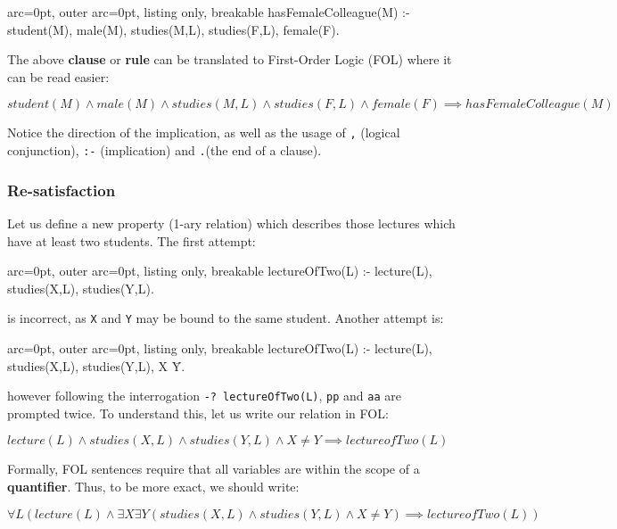 \begin{tcblisting}{ arc=0pt, outer arc=0pt, listing only, breakable}
hasFemaleColleague(M) :- student(M), male(M), studies(M,L), studies(F,L), female(F).

\end{tcblisting}


The above \textbf{clause} or \textbf{rule} can be translated to First-Order Logic (FOL) where it can be read easier:

$student(M) \wedge male(M) \wedge studies(M,L) \wedge studies(F,L) \wedge female(F) \implies hasFemaleColleague(M)$

Notice the direction of the implication, as well as the usage of \texttt{,} (logical conjunction), \texttt{:-} (implication) and \texttt{.}(the end of a clause).

\subsubsection*{ Re-satisfaction }

Let us define a new property (1-ary relation) which describes those lectures which have at least two students. The first attempt:


\begin{tcblisting}{ arc=0pt, outer arc=0pt, listing only, breakable}
lectureOfTwo(L) :- lecture(L), studies(X,L), studies(Y,L).

\end{tcblisting}


is incorrect, as \texttt{X} and \texttt{Y} may be bound to the same student. Another attempt is:


\begin{tcblisting}{ arc=0pt, outer arc=0pt, listing only, breakable}
lectureOfTwo(L) :- lecture(L), studies(X,L), studies(Y,L), X \= Y.

\end{tcblisting}


however following the interrogation \texttt{-? lectureOfTwo(L)}, \texttt{pp} and \texttt{aa} are prompted twice. To understand this, let us write our relation in FOL:

$lecture(L) \wedge studies(X,L) \wedge studies(Y,L) \wedge X \neq Y \implies lectureofTwo(L)$

Formally, FOL sentences require that all variables are within the scope of a \textbf{quantifier}. Thus, to be more exact, we should write:

$\forall L( lecture(L) \wedge \exists X \exists Y (studies(X,L) \wedge studies(Y,L) \wedge X \neq Y) \implies lectureofTwo(L))$

